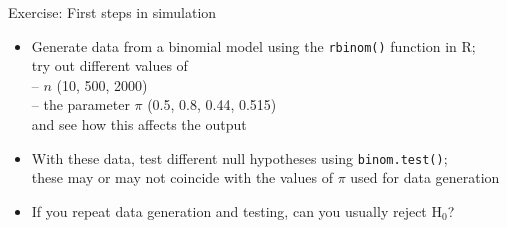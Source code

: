 \documentclass[aspectratio=169]{beamer}
\begin{document}


\begin{frame}{Exercise: First steps in simulation}

\begin{itemize}
\item Generate data from a binomial model using the \texttt{rbinom()} function
in R;\\
try out different values of\\[1ex]
-- $n$ (10, 500, 2000)\\
-- the parameter $\pi$ (0.5, 0.8, 0.44, 0.515)\\[1ex]
and see how this affects the output\\[1ex]

\item With these data, test different null hypotheses using
\texttt{binom.test()};\\
these may or may not coincide with the values of $\pi$ used for data
generation\\[1ex]

\item If you repeat data generation and testing, can you usually reject H$_0$?
\end{itemize}

\end{frame}
\end{document}
